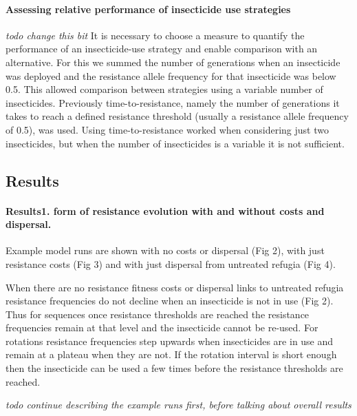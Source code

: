 \documentclass[11pt,]{article}
\let\oldparagraph\paragraph
\renewcommand{\paragraph}[1]{\oldparagraph{#1}\mbox{}}
\begin{document}
\paragraph{Assessing relative performance of insecticide use
strategies}\label{assessing-relative-performance-of-insecticide-use-strategies}

\emph{todo change this bit} It is necessary to choose a measure to
quantify the performance of an insecticide-use strategy and enable
comparison with an alternative. For this we summed the number of
generations when an insecticide was deployed and the resistance allele
frequency for that insecticide was below 0.5. This allowed comparison
between strategies using a variable number of insecticides. Previously
time-to-resistance, namely the number of generations it takes to reach a
defined resistance threshold (usually a resistance allele frequency of
0.5), was used. Using time-to-resistance worked when considering just
two insecticides, but when the number of insecticides is a variable it
is not sufficient.

\subsection{Results}\label{results}

\paragraph{Results1. form of resistance evolution with and without costs
and
dispersal.}\label{results1.-form-of-resistance-evolution-with-and-without-costs-and-dispersal.}

Example model runs are shown with no costs or dispersal (Fig 2), with
just resistance costs (Fig 3) and with just dispersal from untreated
refugia (Fig 4).

When there are no resistance fitness costs or dispersal links to
untreated refugia resistance frequencies do not decline when an
insecticide is not in use (Fig 2). Thus for sequences once resistance
thresholds are reached the resistance frequencies remain at that level
and the insecticide cannot be re-used. For rotations resistance
frequencies step upwards when insecticides are in use and remain at a
plateau when they are not. If the rotation interval is short enough then
the insecticide can be used a few times before the resistance thresholds
are reached.

\emph{todo continue describing the example runs first, before talking
about overall results}
\end{document}
